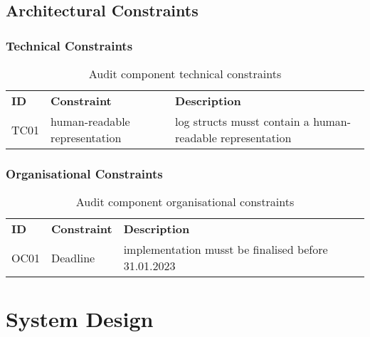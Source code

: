 \subsection{Architectural Constraints}

\subsubsection{Technical Constraints}

\begin{table}[H]
  \begin{center}
    \caption{Audit component technical constraints}
    \label{tab:actc}
    \def\arraystretch{1.5}
    \begin{tabularx}{\linewidth}{|l l X |}
      \hline
      \rowcolor{gray!20}
      \textbf{ID} & \textbf{Constraint} & \textbf{Description}\\
      TC01 & human-readable representation & log structs musst contain a human-readable representation\\
      \hline
    \end{tabularx}
  \end{center}
\end{table}

\subsubsection{Organisational Constraints}

\begin{table}[H]
  \begin{center}
    \caption{Audit component organisational constraints}
    \label{tab:acoc}
    \def\arraystretch{1.5}
    \begin{tabularx}{\linewidth}{|l l X |}
      \hline
      \rowcolor{gray!20}
      \textbf{ID} & \textbf{Constraint} & \textbf{Description}\\
      OC01 & Deadline & implementation musst be finalised before 31.01.2023\\
      \hline
    \end{tabularx}
  \end{center}
\end{table}

\section{System Design}


